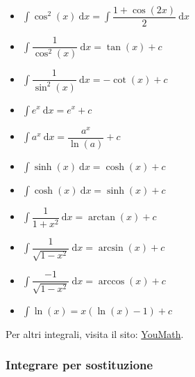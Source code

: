 \documentclass[a4paper]{article}
\begin{document}
	\begin{multicols}{2}
		\begin{itemize}
			\item $\displaystyle\int \cos^{2}\left(x\right) \: \mathrm{d}x = \int\dfrac{1+\cos\left(2x\right)}{2} \:\mathrm{d}x$

			\item $\displaystyle\int \dfrac{1}{\cos^{2}\left(x\right)} \: \mathrm{d}x = \tan\left(x\right) + c$

			\item $\displaystyle\int \dfrac{1}{\sin^{2}\left(x\right)} \: \mathrm{d}x = -\cot\left(x\right) + c$

			\item $\displaystyle\int e^{x} \: \mathrm{d}x = e^{x} + c$

			\item $\displaystyle\int a^{x} \: \mathrm{d}x = \dfrac{a^{x}}{\ln\left(a\right)} + c$

			\item $\displaystyle\int \sinh\left(x\right) \: \mathrm{d}x = \cosh\left(x\right) + c$

			\item $\displaystyle\int \cosh\left(x\right) \: \mathrm{d}x = \sinh\left(x\right) + c$

			\item $\displaystyle\int \dfrac{1}{1+x^{2}} \: \mathrm{d}x = \arctan\left(x\right) + c$

			\item $\displaystyle\int \dfrac{1}{\sqrt{1-x^{2}}} \: \mathrm{d}x = \arcsin\left(x\right) + c$

			\item $\displaystyle\int \dfrac{-1}{\sqrt{1-x^{2}}} \: \mathrm{d}x = \arccos\left(x\right) + c$
			
			\item $\displaystyle\int\ln\left(x\right) = x\left(\ln\left(x\right)-1\right) + c$
		\end{itemize}
	\end{multicols}
	Per altri integrali, visita il sito: \href{https://www.youmath.it/lezioni/analisi-matematica/integrali/596-integrali-notevoli.html}{YouMath}.\newpage

	\subsubsection{Integrare per sostituzione}\label{subsubsection: integrale per sostituzione}
\end{document}
